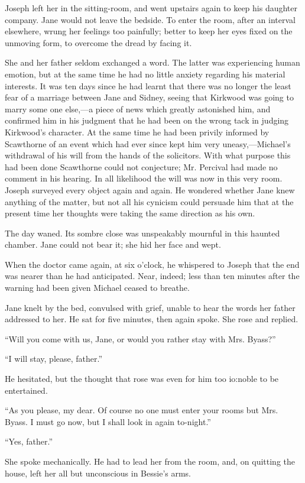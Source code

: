 Joseph left her in the sitting-room, and went upstairs again to keep his
daughter company. Jane would not leave the bedside. To enter the room,
after an interval elsewhere, wrung her feelings too painfully; better to
keep her eyes fixed on the unmoving form, to overcome the dread by
facing it.

{\protect\hypertarget{168}{}{}}She and her father seldom exchanged a
word. The latter was experiencing human emotion, but at the same time he
had no little anxiety regarding his material interests. It was ten days
since he had learnt that there was no longer the least fear of a
marriage between Jane and Sidney, seeing that Kirkwood was going to
marry some one else,---a piece of news which greatly astonished him, and
confirmed him in his judgment that he had been on the wrong tack in
judging Kirkwood's character. At the same time he had been privily
informed by Scawthorne of an event which had ever since kept him very
uneasy,---Michael's withdrawal of his will from the hands of the
solicitors. With what purpose this had been done Scawthorne could not
conjecture; Mr. Percival had made no comment in his hearing. In all
likelihood the will was now in this very room. Joseph surveyed every
object again and again. He wondered whether Jane knew anything of the
matter, but not all his cynicism could persuade him that at the present
time her thoughts were taking the same direction as his own.

The day waned. Its sombre close was
{\protect\hypertarget{169}{}{}}unspeakably mournful in this haunted
chamber. Jane could not bear it; she hid her face and wept.

When the doctor came again, at six o'clock, he whispered to Joseph that
the end was nearer than he had anticipated. Near, indeed; less than ten
minutes after the warning had been given Michael ceased to breathe.

Jane knelt by the bed, convulsed with grief, unable to hear the words
her father addressed to her. He sat for five minutes, then again spoke.
She rose and replied.

``Will you come with us, Jane, or would you rather stay with Mrs.
Byass?''

``I will stay, please, father.''

He hesitated, but the thought that rose was even for him too io:noble to
be entertained.

``As you please, my dear. Of course no one must enter your rooms but
Mrs. Byass. I must go now, but I shall look in again to-night.''

``Yes, father.''

She spoke mechanically. He had to lead her from the room, and, on
quitting the house, left her all but unconscious in Bessie's arms.
